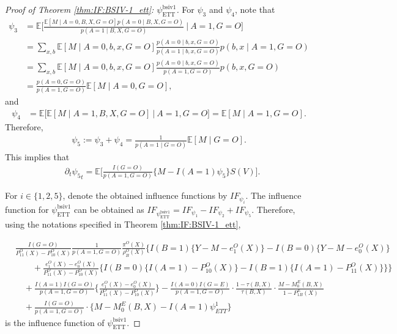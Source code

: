 \documentclass[10pt]{article}
\newcommand{\E}{\mathbb{E}}
\begin{document}
\begin{proof}[Proof of Theorem \ref{thm:IF:BSIV-1_ett}: $\psi_{\text{ETT}}^{\text{bsiv1}}$]
For $\psi_3$ and $\psi_4$, note that
\begin{align*}
\psi_3
&=\E\big[\frac{\E[M\mid A=0,B,X,G=O]p(A=0\mid B,X,G=O)}{p(A=1\mid B,X,G=O)}~\big|~ A=1,G=O\big]\\	
&=\sum_{x,b}\E[M\mid A=0,b,x,G=O]\frac{p(A=0\mid b,x,G=O)}{p(A=1\mid b,x,G=O)}p(b,x\mid A=1,G=O)\\
&=\sum_{x,b}\E[M\mid A=0,b,x,G=O]\frac{p(A=0\mid b,x,G=O)}{p(A=1,G=O)}p(b,x,G=O)\\
&=\frac{p(A=0,G=O)}{p(A=1,G=O)}\E[M\mid A=0,G=O],
\end{align*}
and
\begin{align*}
\psi_4
&=\E\big[\E[M\mid A=1,B,X,G=O]~\big|~ A=1,G=O\big]=\E[M\mid A=1,G=O].
\end{align*}
Therefore,
\begin{align*}
\psi_5:=\psi_3+\psi_4
=\frac{1}{p(A=1\mid G=O)}\E[M\mid G=O].
\end{align*}
This implies that
\begin{align*}
&\partial_t{\psi_5}_t=\E\Big[
\frac{I(G=O)}{p(A=1,G=O)}\big\{
M-I(A=1)\psi_5
\big\}S(V)
\Big].	
\end{align*}


For $i\in\{1,2,5\}$, denote the obtained influence functions by $IF_{\psi_i}$. The influence function for $\psi_{\text{ETT}}^{\text{bsiv1}}$ can be obtained as $IF_{\psi_{\text{ETT}}^{\text{bsiv1}}}=IF_{\psi_1}-IF_{\psi_2}+IF_{\psi_5}$. Therefore, using the notations specified in Theorem \ref{thm:IF:BSIV-1_ett},

\begin{align*}
    &\frac{I(G=O)}{P_{11}^O(X)-P_{10}^O(X)}\frac{1}{p(A=1,G=O)}\frac{\pi^O(X)}{\rho_B^O(X)}\bigg\{I(B=1)\{Y-M-e_1^O(X)\}-I(B=0)\{Y-M-e_0^O(X)\}\\
&\quad\quad+\frac{e_1^O(X)-e_0^O(X)}{P_{11}^O(X)-P_{10}^O(X)}\big\{I(B=0)\{I(A=1)-P_{10}^O(X)\}-I(B=1)\{I(A=1)-P_{11}^O(X)\}\big\}\bigg\}\\
&\quad+\frac{I(A=1)I(G=O)}{p(A=1,G=O)}\Big\{\frac{e_1^O(X)-e_0^O(X)}{P_{11}^O(X)-P_{10}^O(X)}\Big\}-\frac{I(A=0)I(G=E)}{p(A=1,G=O)}\cdot\frac{1-\tau(B,X)}{\tau(B,X)}\cdot
\frac{M-M_{0}^{E}(B,X)}{1-P_{1B}^E(X)}\\
&\quad+\frac{I(G=O)}{p(A=1,G=O)}\cdot \{M-M_{0}^{E}(B,X)-I(A=1)\psi^1_{ETT}\}
\end{align*}
is the influence function of $\psi_{\text{ETT}}^{\text{bsiv1}}$.

\end{proof}
\end{document}

